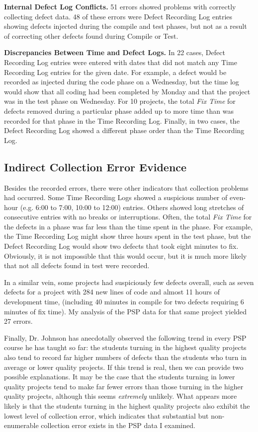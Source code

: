 {\bf Internal Defect Log Conflicts.} 51 errors showed problems with
correctly collecting defect data.  48 of these errors were Defect Recording
Log entries showing defects injected during the compile and test phases,
but not as a result of correcting other defects found during Compile or
Test.
      
{\bf Discrepancies Between Time and Defect Logs.} In 22 cases, Defect
Recording Log entries were entered with dates that did not match any Time
Recording Log entries for the given date.  For example, a defect would be
recorded as injected during the code phase on a Wednesday, but the time log
would show that all coding had been completed by Monday and that the
project was in the test phase on Wednesday.  For 10 projects, the total
{\it Fix Time} for defects removed during a particular phase added up to
more time than was recorded for that phase in the Time Recording Log.
Finally, in two cases, the Defect Recording Log showed a different phase
order than the Time Recording Log.

\subsection{\label{section:IndirectCollection}Indirect Collection Error Evidence}

Besides the recorded errors, there were other indicators that collection
problems had occurred. Some Time Recording Logs showed a suspicious number
of even-hour (e.g. 6:00 to 7:00, 10:00 to 12:00) entries.  Others showed
long stretches of consecutive entries with no breaks or interruptions.
Often, the total {\it Fix Time} for the defects in a phase was far less
than the time spent in the phase. For example, the Time Recording Log might
show three hours spent in the test phase, but the Defect Recording Log
would show two defects that took eight minutes to fix.  Obviously, it is
not impossible that this would occur, but it is much more likely that not
all defects found in test were recorded.

In a similar vein, some projects had suspiciously few defects overall, such
as seven defects for a project with 284 new lines of code and almost 11 hours 
of development time, (including 40 minutes in compile for two defects requiring 
6 minutes of fix time). My analysis of the PSP data for that same project 
yielded 27 errors.

Finally, Dr. Johnson has anecdotally observed the following trend in every
PSP course he has taught so far: the students turning in the highest
quality projects also tend to record far higher numbers of defects than the
students who turn in average or lower quality projects.  If this trend is
real, then we can provide two possible explanations. It may be the case
that the students turning in lower quality projects tend to make far fewer
errors than those turning in the higher quality projects, although this
seems {\em extremely} unlikely.  What appears more likely is that the
students turning in the highest quality projects also exhibit the lowest
level of collection error, which indicates that substantial but
non-enumerable collection error exists in the PSP data I examined.


